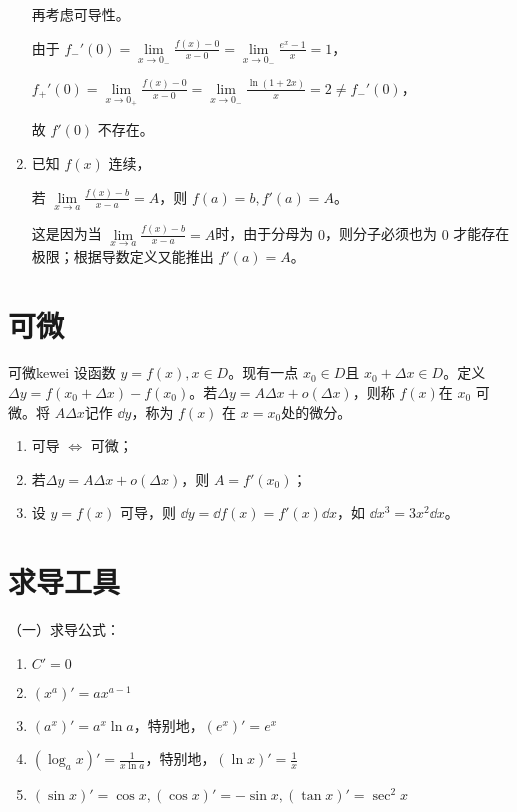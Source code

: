 \begin{note}
\begin{enumerate}
\begin{solution}
            再考虑可导性。
        
            由于 $f_{-}'(0)=\lim\limits_{x\to 0_{-}}\frac{f(x)-0}{x-0}=\lim\limits_{x \to 0_{-}}\frac{e^x-1}{x}=1$，
        
            $f_{+}'(0)=\lim\limits_{x\to 0_{+}}\frac{f(x)-0}{x-0}=\lim\limits_{x \to 0_{-}}\frac{\ln(1+2x)}{x}=2 \neq f_{-}'(0)$，
        
            故 $f'(0)$ 不存在。
        \end{solution}

        \item 已知 $f(x)$ 连续，
        
        若 $\lim\limits_{x \to a}\frac{f(x)-b}{x-a}=A$，则 $f(a)=b,f'(a)=A$。

        这是因为当 $\lim\limits_{x \to a}\frac{f(x)-b}{x-a}=A$时，由于分母为 $0$，则分子必须也为 $0$ 才能存在极限；根据导数定义又能推出 $f'(a)=A$。
        \end{enumerate}
        \end{note}
    \section{可微}
    \begin{definition}{可微}{kewei}
    设函数 $y=f(x),x\in D$。现有一点 $x_0\in D$且 $x_0+\Delta x \in D$。定义 $\Delta y=f(x_0+\Delta x)-f(x_0)$。若$\Delta y=A\Delta x+o(\Delta x)$，则称 $f(x)$在 $x_0$ 可微。将 $A\Delta x$记作 $\dd{y}$，称为 $f(x)$ 在 $x=x_0$处的微分。
    \end{definition}
    
    \begin{note}
        \begin{enumerate}
            \item 可导 $\Leftrightarrow$ 可微；
            \item 若$\Delta y = A\Delta x+o(\Delta x)$，则 $A=f'(x_0)$；
            \item 设 $y=f(x)$ 可导，则 $\dd{y} = \dd{f(x)}=f'(x)\dd{x}$，如 $\dd{x^3}=3x^2\dd{x}$。 
        \end{enumerate}
    
    \section{求导工具}
    （一）求导公式：
    \begin{enumerate}
        \item $C'=0$
        \item $(x^a)'=ax^{a-1}$
        \item $(a^x)'=a^x\ln a$，特别地，$(e^x)'=e^x$
        \item $(\log_a x)'=\frac{1}{x\ln a}$，特别地，$(\ln x)'=\frac{1}{x}$
        \item $(\sin x)'=\cos x,(\cos x)'=-\sin x,(\tan x)'=\sec ^2 x$
    \end{enumerate}

\end{note}




